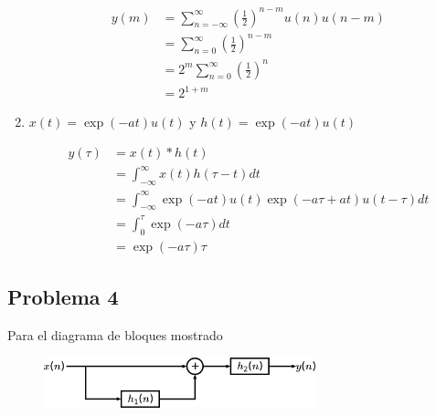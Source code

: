 \documentclass[a4paper,12pt,final]{article}
\begin{document}
\begin{enumerate}[label=\alph*)]
          \begin{equation*}
            \begin{split}
              y\left(m\right) & = \sum_{n=-\infty}^{\infty} \left(\frac{1}{2}\right)^{n-m} u\left(n\right) u\left(n-m\right) \\
                              & = \sum_{n=0}^{\infty} \left(\frac{1}{2}\right)^{n-m} \\
                              & = 2^{m} \sum_{n=0}^{\infty} \left(\frac{1}{2}\right)^{n} \\
                              & = 2^{1+m}
            \end{split}
          \end{equation*}

        \item $x\left(t\right) = \exp\left(-at\right) u(t)$ y $h(t) = \exp\left(-at\right) u(t)$

          \begin{equation*}
            \begin{split}
              y\left(\tau\right) & = x\left(t\right) * h\left(t\right) \\
                                 & = \int_{-\infty}^{\infty} x\left(t\right)h\left(\tau-t\right)dt \\
                                 & = \int_{-\infty}^{\infty} \exp\left(-at\right) u(t) \exp\left(-a\tau + at\right) u(t-\tau) dt\\
                                 & = \int_{0}^{\tau} \exp\left(-a\tau\right) dt \\
                                 & = \exp\left(-a\tau\right) \tau
            \end{split}
          \end{equation*}

      \end{enumerate}

  \newpage
  \subsection*{Problema 4}
    \noindent Para el diagrama de bloques mostrado
    \begin{figure}[H]
      \begin{center}
        \includegraphics[width=0.7\textwidth]{./laboratorio_3/problema04_diagram.png}
      \end{center}
    \end{figure}
\end{document}
